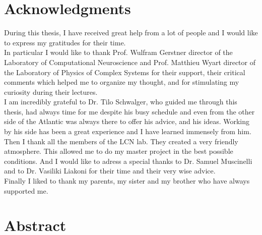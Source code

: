 \documentclass[12pt,twoside]{report}
\begin{document}
\newpage\null\thispagestyle{empty}\newpage

\chapter*{Acknowledgments}
\thispagestyle{empty}
During this thesis, I have received great help from a lot of people and I would like to express my gratitudes for their time.\\
In particular I would like to thank Prof. Wulfram Gerstner director of the Laboratory of Computational Neuroscience and Prof. Matthieu Wyart director of the Laboratory of Physics of Complex Systems for their support, their critical comments which helped me to organize my thought, and for stimulating my curiosity during their lectures.\\
I am incredibly grateful to Dr. Tilo Schwalger, who guided me through this thesis, had always time for me despite his busy schedule and even from the other side of the Atlantic was always there to offer his advice, and his ideas. Working by his side has been a great experience and I have learned immensely from him. \\
Then I thank all the members of the LCN lab. They created a very friendly atmosphere. This allowed me to do my master project in the best possible conditions. And I would like to adress a special thanks to Dr. Samuel Muscinelli and to Dr. Vasiliki Liakoni for their time and their very wise advice.\\
Finally I liked to thank my parents, my sister and my brother who have always supported me.



\newpage\null\thispagestyle{empty}\newpage


\chapter*{Abstract}
\thispagestyle{empty}








\clearpage\newpage\null\thispagestyle{empty}\newpage


\tableofcontents
\thispagestyle{empty}


\newpage\null\thispagestyle{empty}\newpage
\end{document}
